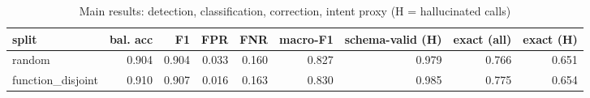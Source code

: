 \begin{table}[t]
\centering
\caption{Main results: detection, classification, correction, intent proxy (H = hallucinated calls)}
\label{tab:main_results}
\begin{tabular}{lrrrrrrrr}
\hline
split & bal. acc & F1 & FPR & FNR & macro-F1 & schema-valid (H) & exact (all) & exact (H) \\
\hline
random & 0.904 & 0.904 & 0.033 & 0.160 & 0.827 & 0.979 & 0.766 & 0.651 \\
function\_disjoint & 0.910 & 0.907 & 0.016 & 0.163 & 0.830 & 0.985 & 0.775 & 0.654 \\
\hline
\end{tabular}
\end{table}
